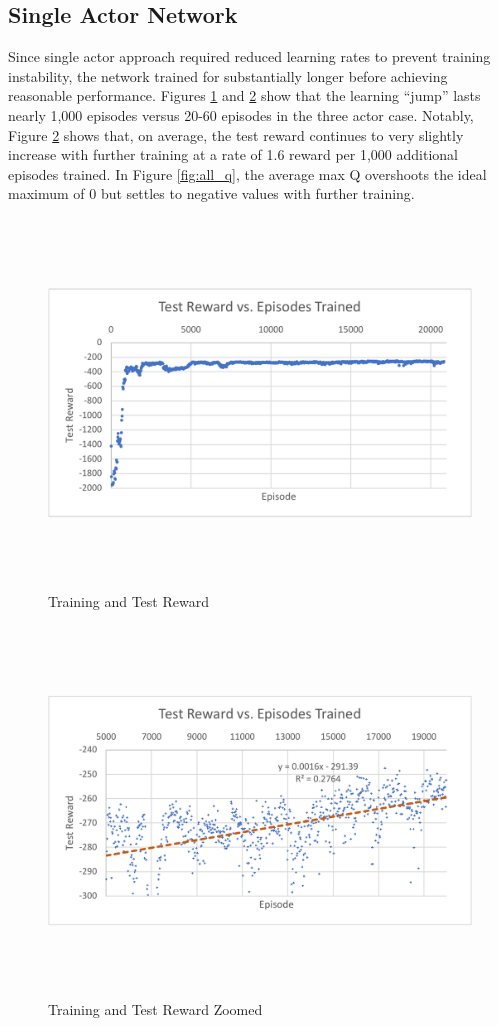 \subsection{Single Actor Network}
Since single actor approach required reduced learning rates to prevent training instability, the network trained for substantially longer before achieving reasonable performance. Figures \ref{fig:all_r} and \ref{fig:all_rzoom} show that the learning ``jump'' lasts nearly 1,000 episodes versus 20-60 episodes in the three actor case. Notably, Figure \ref{fig:all_rzoom} shows that, on average, the test reward continues to very slightly increase with further training at a rate of 1.6 reward per 1,000 additional episodes trained. In Figure \ref{fig:all_q}, the average max Q overshoots the ideal maximum of 0 but settles to negative values with further training.
\begin{figure}[H]
	\includegraphics[width=6in, height=3.85in, keepaspectratio]{figures/train_figs/all_r.pdf}
	\caption{Training and Test Reward} \label{fig:all_r}
\end{figure}
\begin{figure}[H]
	\includegraphics[width=6in, height=3.85in, keepaspectratio]{figures/train_figs/all_rzoom.pdf}
	\caption{Training and Test Reward Zoomed} \label{fig:all_rzoom}
\end{figure}
